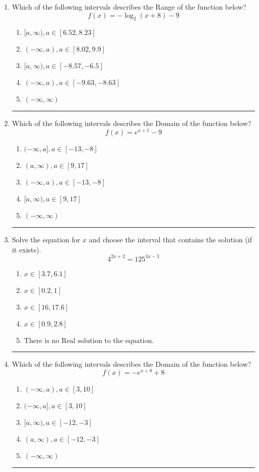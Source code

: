 \documentclass[14pt]{extbook}
\newcommand{\litem}[1]{\item#1\hspace*{-1cm}\rule{\textwidth}{0.4pt}}
\begin{document}
\begin{enumerate}
\litem{
Which of the following intervals describes the Range of the function below?\[ f(x) = -\log_2{(x+8)}-9 \]\begin{enumerate}[label=\Alph*.]
\item \( [a, \infty), a \in [6.52, 8.23] \)
\item \( (-\infty, a), a \in [8.02, 9.9] \)
\item \( [a, \infty), a \in [-8.57, -6.5] \)
\item \( (-\infty, a), a \in [-9.63, -8.63] \)
\item \( (-\infty, \infty) \)

\end{enumerate} }
\litem{
Which of the following intervals describes the Domain of the function below?\[ f(x) = e^{x+1}-9 \]\begin{enumerate}[label=\Alph*.]
\item \( (-\infty, a], a \in [-13, -8] \)
\item \( (a, \infty), a \in [9, 17] \)
\item \( (-\infty, a), a \in [-13, -8] \)
\item \( [a, \infty), a \in [9, 17] \)
\item \( (-\infty, \infty) \)

\end{enumerate} }
\litem{
Solve the equation for $x$ and choose the interval that contains the solution (if it exists).\[ 4^{2x+2} = 125^{3x-3} \]\begin{enumerate}[label=\Alph*.]
\item \( x \in [3.7, 6.1] \)
\item \( x \in [0.2, 1] \)
\item \( x \in [16, 17.6] \)
\item \( x \in [0.9, 2.8] \)
\item \( \text{There is no Real solution to the equation.} \)

\end{enumerate} }
\litem{
Which of the following intervals describes the Domain of the function below?\[ f(x) = -e^{x+8}+8 \]\begin{enumerate}[label=\Alph*.]
\item \( (-\infty, a), a \in [3, 10] \)
\item \( (-\infty, a], a \in [3, 10] \)
\item \( [a, \infty), a \in [-12, -3] \)
\item \( (a, \infty), a \in [-12, -3] \)
\item \( (-\infty, \infty) \)


\end{enumerate}}
\end{enumerate}
\end{document}
